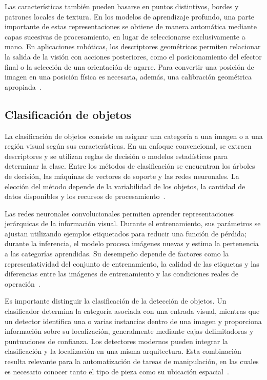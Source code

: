 Las características también pueden basarse en puntos distintivos, bordes y patrones locales de textura. En los modelos de aprendizaje profundo, una parte importante de estas representaciones se obtiene de manera automática mediante capas sucesivas de procesamiento, en lugar de seleccionarse exclusivamente a mano. En aplicaciones robóticas, los descriptores geométricos permiten relacionar la salida de la visión con acciones posteriores, como el posicionamiento del efector final o la selección de una orientación de agarre. Para convertir una posición de imagen en una posición física es necesaria, además, una calibración geométrica apropiada~\cite{szeliski2022computer,corke2017robotics}.

\subsection{Clasificación de objetos}
La clasificación de objetos consiste en asignar una categoría a una imagen o a una región visual según sus características. En un enfoque convencional, se extraen descriptores y se utilizan reglas de decisión o modelos estadísticos para determinar la clase. Entre los métodos de clasificación se encuentran los árboles de decisión, las máquinas de vectores de soporte y las redes neuronales. La elección del método depende de la variabilidad de los objetos, la cantidad de datos disponibles y los recursos de procesamiento~\cite{szeliski2022computer}.

Las redes neuronales convolucionales permiten aprender representaciones jerárquicas de la información visual. Durante el entrenamiento, sus parámetros se ajustan utilizando ejemplos etiquetados para reducir una función de pérdida; durante la inferencia, el modelo procesa imágenes nuevas y estima la pertenencia a las categorías aprendidas. Su desempeño depende de factores como la representatividad del conjunto de entrenamiento, la calidad de las etiquetas y las diferencias entre las imágenes de entrenamiento y las condiciones reales de operación~\cite{gonzalez2018digital,szeliski2022computer}.

Es importante distinguir la clasificación de la detección de objetos. Un clasificador determina la categoría asociada con una entrada visual, mientras que un detector identifica una o varias instancias dentro de una imagen y proporciona información sobre su localización, generalmente mediante cajas delimitadoras y puntuaciones de confianza. Los detectores modernos pueden integrar la clasificación y la localización en una misma arquitectura. Esta combinación resulta relevante para la automatización de tareas de manipulación, en las cuales es necesario conocer tanto el tipo de pieza como su ubicación espacial~\cite{szeliski2022computer}.

